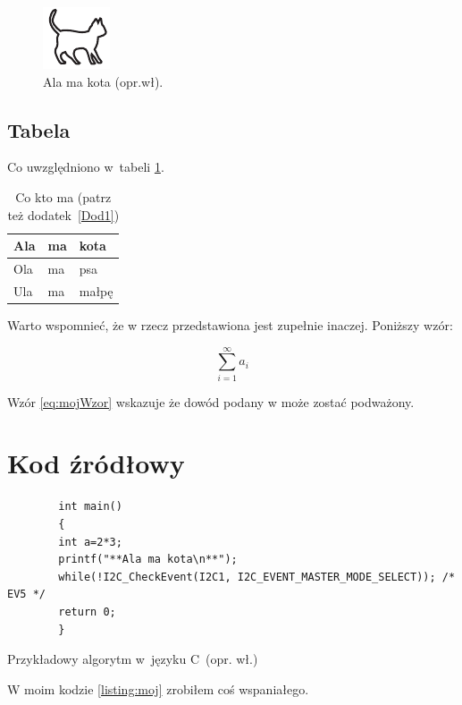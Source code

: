 \begin{figure}[H]
    \centering\includegraphics[width=.4\textwidth]{img/kotek}
    \caption{Ala ma kota (opr.wł).}\label{rysunek:kot}
\end{figure}

\subsection{Tabela}

Co uwzględniono w~tabeli \ref{tabela:coktoma}. \lipsum[13-15]

\begin{table}[h!]
    \centering\caption{Co kto ma\cite{harel_rzecz_2008} (patrz też dodatek~\ref{Dod1}) \label{tabela:coktoma}}
    \begin{tabular}{|l|l|l|}%
        \hline
        Ala & ma & kota \\
        \hline
        Ola & ma & psa \\
        \hline
        Ula & ma & małpę\\
        \hline
    \end{tabular}
\end{table}

\lipsum[19-20] Warto wspomnieć, że w\cite{aizawa_groundwater_2009} rzecz przedstawiona jest zupełnie inaczej. Poniższy wzór:

\begin{equation}
    \sum_{i=1}^{\infty}a_i
    \label{eq:mojWzor}
\end{equation}

Wzór \ref{eq:mojWzor} wskazuje że dowód podany w\cite{kaleta_experimental_2005} może zostać podważony. \lipsum[9]

\section{Kod źródłowy}

\begin{listing}[h!]
    \begin{verbatim}
        int main()
        {
        int a=2*3;
        printf("**Ala ma kota\n**");
        while(!I2C_CheckEvent(I2C1, I2C_EVENT_MASTER_MODE_SELECT)); /* EV5 */
        return 0;
        }
    \end{verbatim}
    \caption{Przykładowy algorytm w~języku C~(opr. wł.)} \label{listing:moj}
\end{listing}

W moim kodzie \ref{listing:moj} zrobiłem coś wspaniałego. \lipsum[4]

\thispagestyle{normal}
